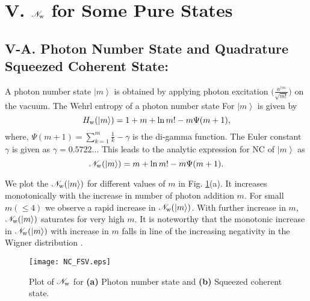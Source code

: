 \documentclass[letter,scriptaddress,twocolumn,prl,showkeys]{revtex4}
\newcommand{\ket}[1]{\left| #1 \right\rangle}
\begin{document}
\section*{V. $\mathscr{N}_{\rm{w}}$ for Some Pure States}

\subsection*{V-A. Photon Number State and Quadrature Squeezed Coherent State:}

A photon number state $\ket m$ is obtained by applying photon excitation $\big( \frac{a^{\dagger m}}{\sqrt{m!}}\big)$ on the vacuum.
The Wehrl entropy of a photon number state For $\ket m$ is given by \cite{ngm_we_ivan}
\begin{equation}
H_{\rm{w}}(\ket m)=1+m+\ln m!-m\Psi(m+1),
\label{eq_we_fock}
\end{equation}
where, $\Psi(m+1)=\sum_{k=1}^{m}\frac{1}{k}-\gamma$ is the di-gamma function.
The Euler constant $\gamma$ is given as $\gamma = 0.5722..$.
This leads to the analytic expression for NC of $\ket m$ as
\begin{equation}
\mathscr{N}_{\rm{w}}(\ket m)=m+\ln m!-m\Psi(m+1).
\label{eq_meas_ncwe_fock}
\end{equation}

We plot the $\mathscr{N}_{\rm{w}}(\ket m)$ for different values of $m$ in Fig. \ref{fig_ncwe_fsv}(a). 
It increases monotonically with the increase in number of photon addition $m$.
For small $m(\leq 4)$ we observe a rapid increase in $\mathscr{N}_{\rm{w}}(\ket m)$.
With further increase in $m$, $\mathscr{N}_{\rm{w}}(\ket m)$ saturates for very high $m$. 
It is noteworthy that the monotonic increase in $\mathscr{N}_{\rm{w}}(\ket m)$ with increase in $m$ falls in line of the increasing negativity in the Wigner distribution \cite{ncm_nwf_kenfack}.
\begin{figure}[h!]
\texttt{[image: NC\_FSV.eps]}
\caption{Plot of $\mathscr{N}_{\rm{w}}$ for {\bf (a)} Photon number state and {\bf (b)} Squeezed coherent state.}
\label{fig_ncwe_fsv}
\end{figure}
\end{document}
